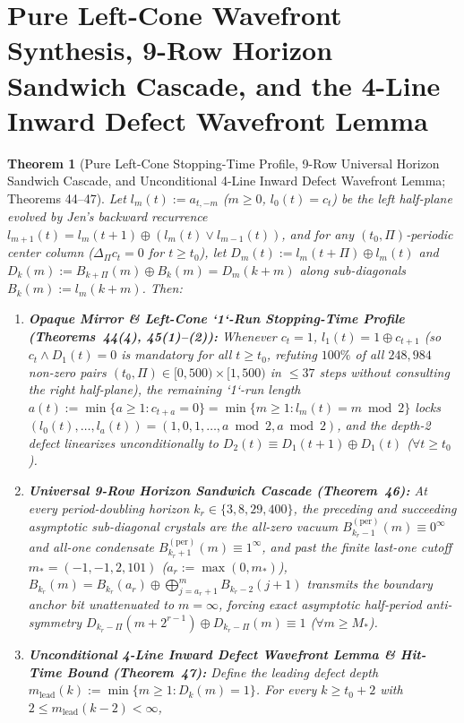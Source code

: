 \documentclass[11pt,a4paper]{article}
\newtheorem{theorem}{Theorem}[section]
\theoremstyle{definition}
\theoremstyle{remark}
\begin{document}
\section{Pure Left-Cone Wavefront Synthesis, 9-Row Horizon Sandwich Cascade, and the 4-Line Inward Defect Wavefront Lemma}

\begin{theorem}[Pure Left-Cone Stopping-Time Profile, 9-Row Universal Horizon Sandwich Cascade, and Unconditional 4-Line Inward Defect Wavefront Lemma; Theorems 44--47]\label{thm:wavefront}
Let $l_m(t) := a_{t,-m}$ ($m \ge 0$, $l_0(t) = c_t$) be the left half-plane evolved by Jen's backward recurrence $l_{m+1}(t) = l_m(t+1) \oplus (l_m(t) \lor l_{m-1}(t))$, and for any $(t_0, \Pi)$-periodic center column ($\Delta_\Pi c_t = 0$ for $t \ge t_0$), let $D_m(t) := l_m(t+\Pi) \oplus l_m(t)$ and $D_k(m) := B_{k+\Pi}(m) \oplus B_k(m) = D_m(k+m)$ along sub-diagonals $B_k(m) := l_m(k+m)$. Then:
\begin{enumerate}
  \item \textbf{Opaque Mirror \& Left-Cone `1`-Run Stopping-Time Profile (Theorems~44(4), 45(1)--(2)):} Whenever $c_t = 1$, $l_1(t) = 1 \oplus c_{t+1}$ (so $c_t \land D_1(t) = 0$ is mandatory for all $t \ge t_0$, refuting $100\%$ of all $248{,}984$ non-zero pairs $(t_0, \Pi) \in [0,500) \times [1,500)$ in $\le 37$ steps without consulting the right half-plane), the remaining `1`-run length $a(t) := \min\{a \ge 1 : c_{t+a} = 0\} = \min\{m \ge 1 : l_m(t) = m \bmod 2\}$ locks $(l_0(t),\dots,l_a(t)) = (1,0,1,\dots,a\bmod 2,a\bmod 2)$, and the depth-2 defect linearizes unconditionally to $D_2(t) \equiv D_1(t+1) \oplus D_1(t)$ ($\forall t \ge t_0$).
  \item \textbf{Universal 9-Row Horizon Sandwich Cascade (Theorem~46):} At every period-doubling horizon $k_r \in \{3, 8, 29, 400\}$, the preceding and succeeding asymptotic sub-diagonal crystals are the all-zero vacuum $B_{k_r-1}^{(\mathrm{per})}(m) \equiv 0^\infty$ and all-one condensate $B_{k_r+1}^{(\mathrm{per})}(m) \equiv 1^\infty$, and past the finite last-one cutoff $m_* = (-1, -1, 2, 101)$ ($a_r := \max(0, m_*)$), $B_{k_r}(m) = B_{k_r}(a_r) \oplus \bigoplus_{j=a_r+1}^m B_{k_r-2}(j+1)$ transmits the boundary anchor bit unattenuated to $m = \infty$, forcing exact asymptotic half-period anti-symmetry $D_{k_r-\Pi}(m + 2^{r-1}) \oplus D_{k_r-\Pi}(m) \equiv 1$ ($\forall m \ge M_*$).
  \item \textbf{Unconditional 4-Line Inward Defect Wavefront Lemma \& Hit-Time Bound (Theorem~47):} Define the leading defect depth $m_{\mathrm{lead}}(k) := \min\{m \ge 1 : D_k(m) = 1\}$. For every $k \ge t_0 + 2$ with $2 \le m_{\mathrm{lead}}(k-2) < \infty$,

\end{enumerate}
\end{theorem}
\end{document}
